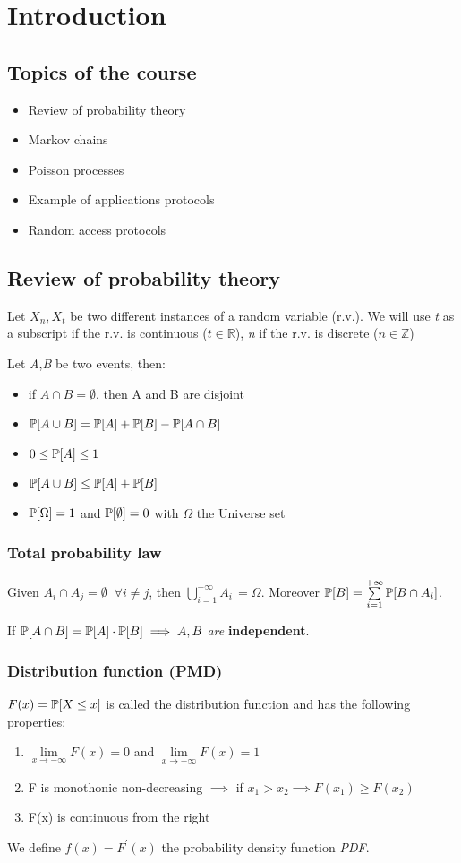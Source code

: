 \chapter{Introduction}
\section{Topics of the course}
\begin{itemize}
  \item Review of probability theory
  \item Markov chains
  \item Poisson processes
  \item Example of applications protocols
  \item Random access protocols
\end{itemize}
\section{Review of probability theory}
Let $X_n, X_t$ be two different instances of a random variable (r.v.). We will use
\textit{t} as a subscript if the r.v. is continuous ($t \in \mathbb{R}$), \textit{n} if the r.v. is discrete ($ n \in \mathbb{Z}$)

Let \textit{A},\textit{B} be two events, then:
\begin{itemize}
  \item if $A \cap B = \emptyset$, then A and B are disjoint
  \item $\mathbb{P}[A \cup B] = \mathbb{P}[A]+\mathbb{P}[B] - \mathbb{P}[A \cap B]$
  \item $0\le \mathbb{P}[A] \le 1$
  \item $\mathbb{P}[A \cup B] \le \mathbb{P}[A]+\mathbb{P}[B]$
  \item $ \mathbb{P}[\Omega]=1 $ and $\mathbb{P}[\emptyset]=0$ with $\Omega$ the Universe set
\end{itemize}
\subsection{Total probability law}
Given $A_i \cap A_j = \emptyset \;\; \forall i \neq j $, then $\bigcup\limits_{i=1}^{+\infty} A_i \, = \Omega$.
Moreover $\mathbb{P}[B]=\sum\limits_{i=1}^{+\infty} \mathbb{P}[B \cap A_i]$.

If $\mathbb{P}[A \cap B] = \mathbb{P}[A]\cdot \mathbb{P}[B] \implies A,B$ \textit{are} \textbf{independent}.

\subsection{Distribution function (PMD)}\label{sec:pmd}
$F(x) = \mathbb{P}[X \le x]$ is called the distribution function and has the following properties:
\begin{enumerate}
  \item $\lim\limits_{x \to -\infty} F(x) = 0$ \quad and \quad $\lim\limits_{x \to +\infty} F(x) = 1$
  \item F is monothonic non-decreasing $\implies$ if $x_1 > x_2 \implies F(x_1)\ge F(x_2)$
  \item F(x) is continuous from the right
\end{enumerate}
We define $f(x)=F^\prime(x)$ the probability density function \textit{PDF}.

